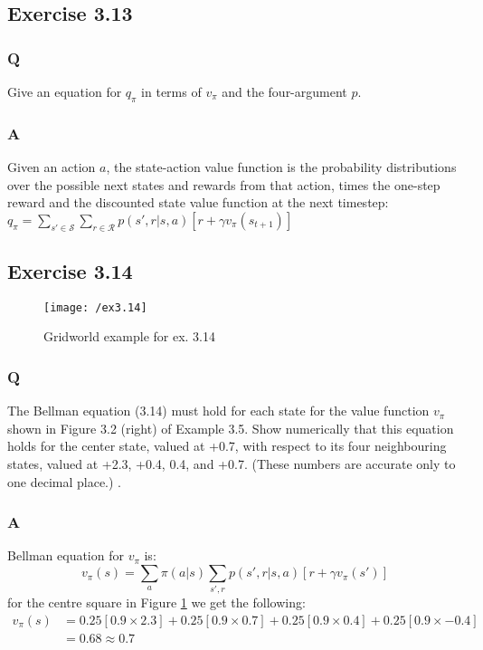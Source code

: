 \subsection{Exercise 3.13}
\subsubsection*{Q}
Give an equation for $q_\pi$ in terms of $v_\pi$ and the four-argument $p$.  

\subsubsection*{A}
Given an action $a$, the state-action value function is the probability distributions over the possible next states and rewards from that action, times the one-step reward and the discounted state value function at the next timestep:
$
q_\pi = \sum_{s' \in \mathcal{S}} \sum_{r \in \mathcal{R}} p(s', r | s, a) [r + \gamma v_\pi(s_{t+1})]
$

\subsection{Exercise 3.14}
\begin{figure}[h!]
	\centering
	\texttt{[image: /ex3.14]}
	\caption{Gridworld example for ex. 3.14}
	\label{fig:3.14}
\end{figure}

\subsubsection*{Q}
The Bellman equation (3.14) must hold for each state for the value function $v_\pi$ shown in Figure 3.2 (right) of Example 3.5. Show numerically that this equation holds for the center state, valued at +0.7, with respect to its four neighbouring states, valued at +2.3, +0.4, 0.4, and +0.7. (These numbers are accurate only to one decimal place.) .  

\subsubsection*{A}
Bellman equation for $v_\pi$ is:
\begin{equation}
v_\pi(s) = \sum_{a} \pi(a | s) \sum_{s', r} p(s', r | s, a) [r + \gamma v_\pi(s')] 
\end{equation}
for the centre square in Figure \ref{fig:3.14} we get the following:
\begin{align}
v_\pi(s) &= 0.25 \left[0.9 \times 2.3\right] + 0.25 \left[0.9 \times 0.7\right] + 0.25 \left[0.9 \times 0.4\right] + 0.25 \left[0.9 \times -0.4\right] \\
			&= 0.68 \approx 0.7 \\
\end{align}

